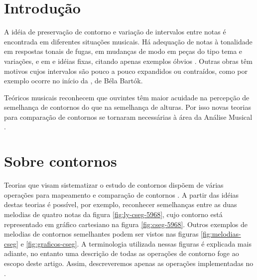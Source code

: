 \chapter{Introdução}
\label{cha:introducao}

A idéia de preservação de contorno e variação de intervalos entre
notas é encontrada em diferentes situações musicais. Há adequação de
notas à tonalidade em respostas tonais de fugas, em mudanças de modo
em peças do tipo tema e variações, e em  e idéias
fixas, citando apenas exemplos óbvios
\cite[p. 29]{morris87:composition}. Outras obras têm motivos cujos
intervalos são pouco a pouco expandidos ou contraídos, como por
exemplo ocorre no início da , de Béla Bartók.

Teóricos musicais reconhecem que ouvintes têm maior acuidade na
percepção de semelhança de contornos do que na semelhança de
alturas. Por isso novas teorias para comparação de contornos se
tornaram necessárias à área da Análise Musical
\cite[p. 226]{marvin.ea87:relating}.

\chapter{Sobre contornos}
\label{cha:sobre-contornos}





Teorias que visam sistematizar o estudo de contornos dispõem de várias
operações para mapeamento e comparação de contornos
\cite{friedmann85:methodology,friedmann87:response,morris87:composition,morris93:directions,marvin.ea87:relating,clifford95:contour,polansky.ea92:possible,quinn97:fuzzy,beard03:contour}
. A partir das idéias destas teorias é
possível, por exemplo, reconhecer semelhanças entre as duas melodias
de quatro notas da figura \ref{fig:ly-cseg-5968}, cujo contorno está
representado em gráfico cartesiano na figura
\ref{fig:cseg-5968}. Outros exemplos de melodias de contornos
semelhantes podem ser vistos nas figuras \ref{fig:melodias-cseg} e
\ref{fig:graficos-cseg}. A terminologia utilizada nessas figuras é
explicada mais adiante, no entanto uma descrição de todas as operações
de contorno foge ao escopo deste artigo. Assim, descreveremos apenas
as operações implementadas no \goiaba.

